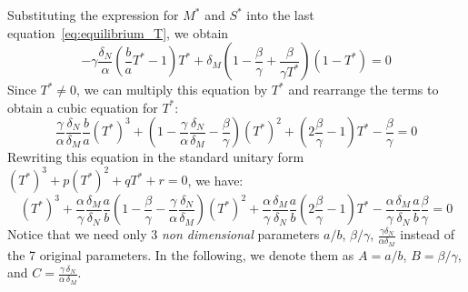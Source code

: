 \documentclass[a4paper, 12pt]{article}
\newtheorem{rem}{Remark}[section]
\begin{document}
Substituting the expression for $M^*$  and $S^*$ into the last equation~\eqref{eq:equilibrium_T}, we obtain 
\begin{equation}
  -\gamma \frac{\delta_N}{\alpha} \left(\frac{b}{a} T^* - 1\right) T^* + \delta_M \left(1 - \frac{\beta}{\gamma} + \frac{\beta}{\gamma T^*}\right) (1 - T^*) = 0      
\end{equation}
Since $T^* \neq 0$, we can multiply this equation by $T^*$ and rearrange the terms to obtain a cubic equation for $T^*$:
\begin{equation}
\frac{\gamma}{\alpha} \frac{\delta_N}{\delta_M} \frac{b}{a} {(T^*)}^3 + \left( 1-   \frac{\gamma}{\alpha} \frac{\delta_N}{\delta_M}  - \frac{\beta}{\gamma}\right) {(T^*)}^2 + \left( 2\frac{\beta}{\gamma} -1 \right) T^* - \frac{\beta}{\gamma} = 0
\end{equation}
Rewriting this equation in the standard unitary form ${(T^*)}^3 + p {(T^*)}^2 + q T^* + r = 0$, we have:
\begin{equation}
{\left(T^*\right)}^3 + \frac{\alpha}{\gamma} \frac{\delta_M}{\delta_N} \frac{a}{b} \left(1- \frac{\beta}{\gamma} - \frac{\gamma}{\alpha} \frac{\delta_N}{\delta_M}\right) {(T^*)}^2 + \frac{\alpha}{\gamma} \frac{\delta_M}{\delta_N} \frac{a}{b} \left(2\frac{\beta}{\gamma} -1 \right) T^* - \frac{\alpha}{\gamma} \frac{\delta_M}{\delta_N} \frac{a}{b} \frac{\beta}{\gamma} = 0
\end{equation}
Notice that we need only 3 \emph{non dimensional} parameters $a/b$, $\beta/\gamma$, $\displaystyle{\frac{\gamma \delta_N}{\alpha \delta_M}}$ instead of the 7 original parameters.
In the following, we denote them as $A=a/b$, $B=\beta/\gamma$, and $C=\displaystyle{\frac{\gamma \,\delta_N}{\alpha\,\delta_M}}$.
\end{document}
